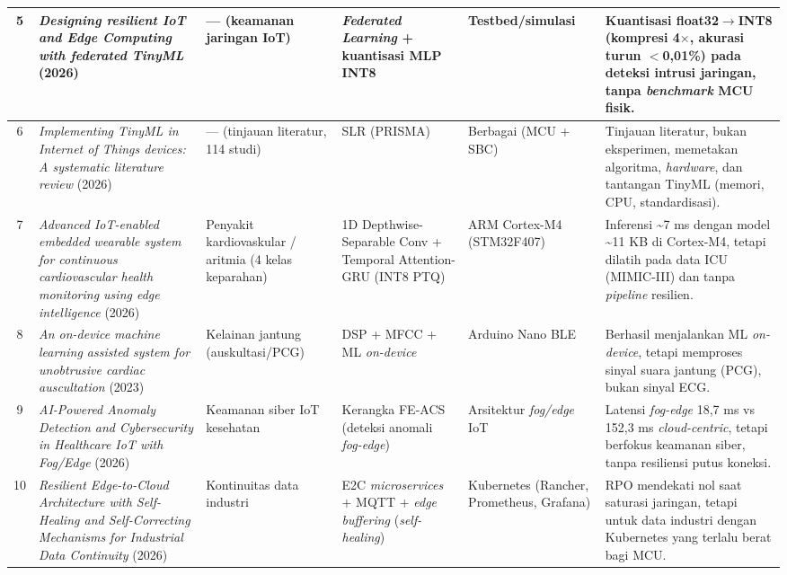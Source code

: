 {\begin{longtable}{|c|L{3.5cm}|L{2.0cm}|L{2.0cm}|L{1.8cm}|L{2.8cm}|}
5 & \textit{Designing resilient IoT and Edge Computing with federated TinyML} (2026) & --- (keamanan jaringan IoT) & \textit{Federated Learning} + kuantisasi MLP INT8 & Testbed/\allowbreak simulasi & Kuantisasi float32$\rightarrow$INT8 (kompresi 4$\times$, akurasi turun $<$0,01\%) pada deteksi intrusi jaringan, tanpa \textit{benchmark} MCU fisik. \\ \hline

6 & \textit{Implementing TinyML in Internet of Things devices: A systematic literature review} (2026) & --- (tinjauan literatur, 114 studi) & SLR (PRISMA) & Berbagai (MCU + SBC) & Tinjauan literatur, bukan eksperimen, memetakan algoritma, \textit{hardware}, dan tantangan TinyML (memori, CPU, standardisasi). \\ \hline

7 & \textit{Advanced IoT-enabled embedded wearable system for continuous cardiovascular health monitoring using edge intelligence} (2026) & Penyakit kardio\-vaskular / aritmia (4 kelas keparahan) & 1D Depthwise-\allowbreak Separable Conv + Temporal Attention-\allowbreak GRU (INT8 PTQ) & ARM Cortex-M4 (STM32\-F407) & Inferensi \textasciitilde7 ms dengan model \textasciitilde11 KB di Cortex-M4, tetapi dilatih pada data ICU (MIMIC-III) dan tanpa \textit{pipeline} resilien. \\ \hline

8 & \textit{An on-device machine learning assisted system for unobtrusive cardiac auscultation} (2023) & Kelainan jantung (auskultasi/\allowbreak PCG) & DSP + MFCC + ML \textit{on-device} & Arduino Nano BLE & Berhasil menjalankan ML \textit{on-device}, tetapi memproses sinyal suara jantung (PCG), bukan sinyal ECG. \\ \hline

9 & \textit{AI-Powered Anomaly Detection and Cybersecurity in Healthcare IoT with Fog/Edge} (2026) & Keamanan siber IoT kesehatan & Kerangka FE-ACS (deteksi anomali \textit{fog-edge}) & Arsitektur \textit{fog/edge} IoT & Latensi \textit{fog-edge} 18,7 ms vs 152,3 ms \textit{cloud-centric}, tetapi berfokus keamanan siber, tanpa resiliensi putus koneksi. \\ \hline

10 & \textit{Resilient Edge-to-Cloud Architecture with Self-Healing and Self-Correcting Mechanisms for Industrial Data Continuity} (2026) & Kontinuitas data industri & E2C \textit{microservices} + MQTT + \textit{edge buffering} (\textit{self-healing}) & Kubernetes (Rancher, Prometheus, Grafana) & RPO mendekati nol saat saturasi jaringan, tetapi untuk data industri dengan Kubernetes yang terlalu berat bagi MCU. \\ \hline


\end{longtable}}
